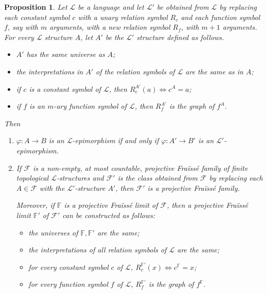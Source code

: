 \documentclass[12pt,twoside,a4paper]{amsart}
\theoremstyle{plain}
\newtheorem{proposition}[theorem]{Proposition}
\theoremstyle{definition}
\begin{document}
\begin{proposition} \label{machrelassional}
Let $ \mathcal L $ be a language and let $ \mathcal L'$ be obtained from $ \mathcal L $ by replacing each constant symbol $c$ with a unary relation symbol $R_c$ and each function symbol $f$, say with $m$ arguments, with a new relation symbol $R_f$, with $m+1$ arguments.
For every $ \mathcal L $ structure $A$, let $A'$ be the $ \mathcal L'$ structure defined as follows.
\begin{itemize}
\item $A'$ has the same universe as $A$;
\item the interpretations in $A'$ of the relation symbols of $ \mathcal L $ are the same as in $A$;
\item if $c$ is a constant symbol of $ \mathcal L $, then $R_c^{A'}(a)\Leftrightarrow c^A=a$;
\item if $f$ is an $m$-ary function symbol of $ \mathcal L $, then $R_f^{A'}$ is the graph of $f^A$.
\end{itemize}
Then
\begin{enumerate}
\item $ {\varphi} :A\to B$ is an $ \mathcal L$-epimorphism if and only if $ {\varphi} :A'\to B'$ is an $ \mathcal L'$-epimorphism.
\item If $ \mathcal F $ is a non-empty, at most countable, projective Fra\"iss\'e family of finite topological $ \mathcal L $-structures and $ \mathcal F'$ is the class obtained from $ \mathcal F $ by replacing each $A\in \mathcal F $ with the $ \mathcal L'$-structure $A'$, then $ \mathcal F'$ is a projective Fra\"iss\'e family.

Moreover, if $ \mathbb F $ is a projective Fra\"iss\'e limit of $ \mathcal F $, then a projective Fra\"iss\'e limit $ \mathbb F'$ of $ \mathcal F'$ can be constructed as follows:
\begin{itemize}
\item the universes of $ \mathbb F , \mathbb F'$ are the same;
\item the interpretations of all relation symbols of $ \mathcal L $ are the same;
\item for every constant symbol $c$ of $ \mathcal L $, $R_c^{ \mathbb F'}(x)\Leftrightarrow c^{ \mathbb F }=x$;
\item for every function symbol $f$ of $ \mathcal L $, $R_f^{ \mathbb F'}$ is the graph of $f^{ \mathbb F}$.
\end{itemize}
\end{enumerate}
\end{proposition}
\end{document}
